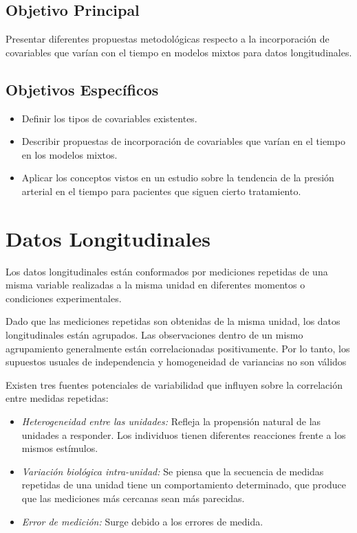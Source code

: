 \documentclass[spanish]{article}
\numberwithin{figure}{subsection}
\numberwithin{equation}{subsection}
\numberwithin{table}{subsection}
\begin{document}
\subsection{Objetivo Principal}

Presentar diferentes propuestas metodológicas respecto a la incorporación de
covariables que varían con el tiempo en modelos mixtos para datos
longitudinales.

\subsection{Objetivos Específicos}

\begin{itemize}
	\item Definir los tipos de covariables existentes.
	\item Describir propuestas de incorporación de covariables que varían en el
	tiempo en los modelos mixtos.
	\item Aplicar los conceptos vistos en un estudio sobre la tendencia de la
		  presión arterial en el tiempo para pacientes que siguen cierto
		  tratamiento.
\end{itemize}

\newpage
\section{Datos Longitudinales}

Los datos longitudinales están conformados por mediciones repetidas de una misma
variable realizadas a la misma unidad en diferentes momentos o condiciones
experimentales.

Dado que las mediciones repetidas son obtenidas de la misma unidad, los datos
longitudinales están agrupados. Las observaciones dentro de un mismo
agrupamiento generalmente están correlacionadas positivamente. Por lo tanto, los
supuestos usuales de independencia y homogeneidad de variancias no son válidos

Existen tres fuentes potenciales de variabilidad que influyen sobre la
correlación entre medidas repetidas:

\begin{itemize}
	\item \textit{Heterogeneidad entre las unidades:} Refleja la propensión
	natural de las unidades a responder. Los individuos tienen diferentes
	reacciones frente a los mismos estímulos.
	\item \textit{Variación biológica intra-unidad:} Se piensa que la secuencia
	de medidas repetidas de una unidad tiene un comportamiento determinado, que
	produce que las mediciones más cercanas sean más parecidas.
	\item \textit{Error de medición:} Surge debido a los errores de medida.
\end{itemize}
\end{document}
